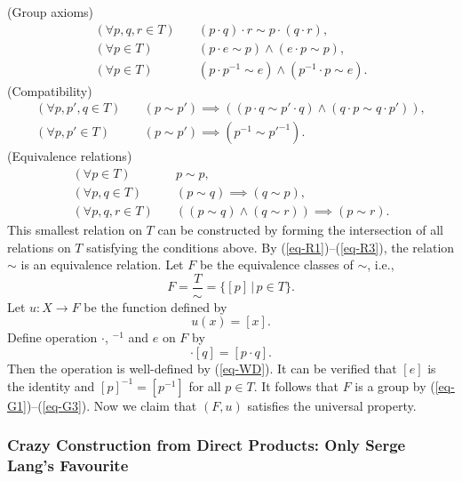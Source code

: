 \noindent(Group axioms)
\begin{align}
	(\forall p, q, r \in T) \quad &(p \cdot q) \cdot r \sim p \cdot (q \cdot r),  \label{eq-G1} \tag{G1}\\
	(\forall p \in T) \quad &(p \cdot e \sim p) \land (e \cdot p \sim p), \tag{G2}\\
	(\forall p \in T) \quad &(p \cdot p^{-1} \sim e) \land (p^{-1} \cdot p \sim e).  \label{eq-G3}\tag{G3}
\end{align}
(Compatibility)
\begin{align}
	(\forall p, p', q \in T) \quad &(p \sim p') \implies ((p \cdot q \sim p' \cdot q) \land (q \cdot p \sim q \cdot p')), \label{eq-C1}\tag{C1}
	\\
	(\forall p,p'\in T) \quad &(p\sim p') \implies (p^{-1} \sim p'^{-1}). \label{eq-C2}\tag{C2}
\end{align}
(Equivalence relations)
\begin{align}
	(\forall p \in T) \quad &p \sim p, \label{eq-R1} \tag{R1} \\
	(\forall p, q \in T) \quad &(p \sim q) \implies (q \sim p), \tag{R2}\\
	(\forall p, q, r \in T) \quad &((p \sim q) \land (q \sim r)) \implies (p \sim r).\label{eq-R3} \tag{R3}
\end{align}
This smallest relation on $T$ can be constructed by forming the intersection of all relations on $T$ satisfying the conditions above. By (\ref{eq-R1})--(\ref{eq-R3}), the relation $\sim$ is an equivalence relation. Let $F$ be the equivalence classes of $\sim$, i.e.,
\begin{equation*}
	F = \frac{T}{\sim} =\{[p]\,|\, p\in T\}.
\end{equation*}
Let $u:X\rightarrow F$ be the function defined by
\begin{equation*}
	u(x) = [x].
\end{equation*}
Define operation $\cdot$, ${}^{-1}$ and $e$ on $F$ by
\begin{equation*}
	[p]\cdot [q] = [p\cdot q].
\end{equation*}
Then the operation is well-defined by (\ref{eq-WD}). It can be verified that $[e]$ is the identity and $[p]^{-1} = [p^{-1}]$ for all $p\in T$. It follows that $F$ is a group by (\ref{eq-G1})--(\ref{eq-G3}). Now we claim that $(F,u)$ satisfies the universal property.



\subsubsection{Crazy Construction from Direct Products: Only Serge Lang's Favourite}
